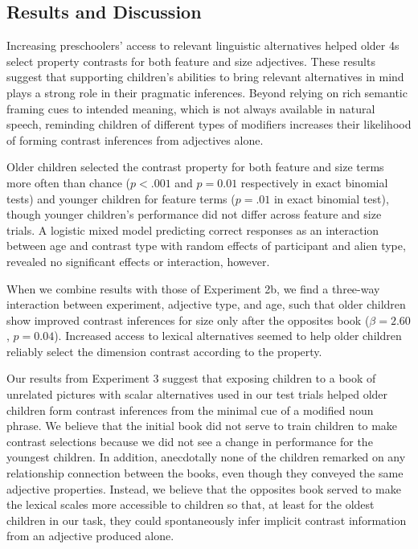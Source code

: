 \documentclass[10pt,letterpaper]{article}
\begin{document}
\subsection{Results and Discussion}

Increasing preschoolers' access to relevant linguistic alternatives helped older 4s select property contrasts for both feature and size adjectives.  These results suggest that supporting children's abilities to bring relevant alternatives in mind plays a strong role in their pragmatic inferences. Beyond relying on rich semantic framing cues to intended meaning, which is not always available in natural speech, reminding children of different types of modifiers increases their likelihood of forming contrast inferences from adjectives alone. 

Older children selected the contrast property for both feature and size terms more often than chance ($p < .001$ and $p = 0.01$ respectively in exact binomial tests) and younger children for feature terms ($p = .01$ in exact binomial test), though younger children's performance did not differ across feature and size trials.  A logistic mixed model predicting correct responses as an interaction between age and contrast type with random effects of participant and alien type, revealed no significant effects or interaction, however.

When we combine results with those of Experiment 2b, we find a three-way interaction between experiment, adjective type, and age, such that older children show improved contrast inferences for size only after the opposites book ($\beta = 2.60$, $p = 0.04$).  Increased access to lexical alternatives seemed to help older children reliably select the dimension contrast according to the property.  

Our results from Experiment 3 suggest that exposing children to a book of unrelated pictures with scalar alternatives used in our test trials helped older children form contrast inferences from the minimal cue of a modified noun phrase.  We believe that the initial book did not serve to train children to make contrast selections because we did not see a change in performance for the youngest children.  In addition, anecdotally none of the children remarked on any relationship connection between the books, even though they conveyed the same adjective properties.  Instead, we believe that the opposites book served to make the lexical scales more accessible to children so that, at least for the oldest children in our task, they could spontaneously infer implicit contrast information from an adjective produced alone.   
\end{document}
